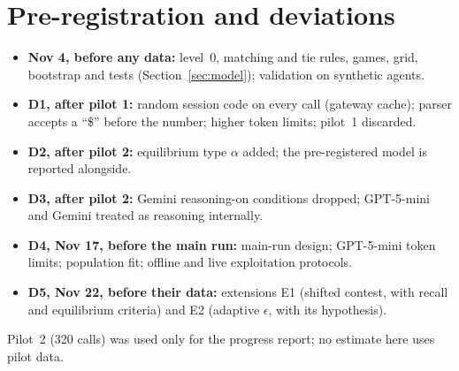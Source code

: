 \documentclass[11pt]{article}
\begin{document}
\section{Pre-registration and deviations}\label{app:dev}
\begin{itemize}
\item \textbf{Nov 4, before any data:} level~0, matching and tie rules, games, grid, bootstrap and tests (Section~\ref{sec:model}); validation on synthetic agents.
\item \textbf{D1, after pilot 1:} random session code on every call (gateway cache); parser accepts a ``\$'' before the number; higher token limits; pilot~1 discarded.
\item \textbf{D2, after pilot 2:} equilibrium type $\alpha$ added; the pre-registered model is reported alongside.
\item \textbf{D3, after pilot 2:} Gemini reasoning-on conditions dropped; GPT-5-mini and Gemini treated as reasoning internally.
\item \textbf{D4, Nov 17, before the main run:} main-run design; GPT-5-mini token limits; population fit; offline and live exploitation protocols.
\item \textbf{D5, Nov 22, before their data:} extensions E1 (shifted contest, with recall and equilibrium criteria) and E2 (adaptive $\epsilon$, with its hypothesis).
\end{itemize}
Pilot~2 (320 calls) was used only for the progress report; no estimate here uses pilot data.
\end{document}
